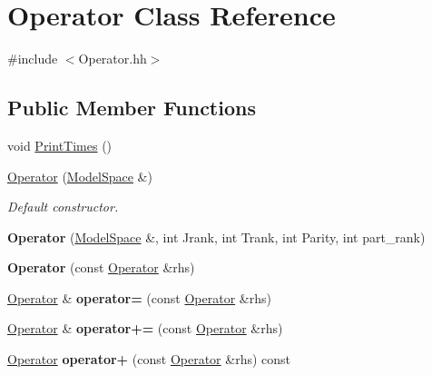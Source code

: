 \hypertarget{classOperator}{\section{Operator Class Reference}
\label{classOperator}
}


{\ttfamily \#include $<$Operator.\-hh$>$}

\subsection*{Public Member Functions}
\begin{DoxyCompactItemize}
\item 
void \hyperlink{classOperator_aa8280e8e2c6be73a9594789127b939c1}{Print\-Times} ()
\item 
\hypertarget{classOperator_ae59dd1e9ea828f88637f001e987195b6}{\hyperlink{classOperator_ae59dd1e9ea828f88637f001e987195b6}{Operator} (\hyperlink{classModelSpace}{Model\-Space} \&)}\label{classOperator_ae59dd1e9ea828f88637f001e987195b6}

\begin{DoxyCompactList}\small\item\em Default constructor. \end{DoxyCompactList}\item 
\hypertarget{classOperator_ab120301ff79330ae6593fd13445f24f1}{{\bfseries Operator} (\hyperlink{classModelSpace}{Model\-Space} \&, int Jrank, int Trank, int Parity, int part\-\_\-rank)}\label{classOperator_ab120301ff79330ae6593fd13445f24f1}

\item 
\hypertarget{classOperator_ae229a22ab49ca258f69c1c2c267b2aeb}{{\bfseries Operator} (const \hyperlink{classOperator}{Operator} \&rhs)}\label{classOperator_ae229a22ab49ca258f69c1c2c267b2aeb}

\item 
\hypertarget{classOperator_afad114ba9dee8b9c08af0b5d27c3ba86}{\hyperlink{classOperator}{Operator} \& {\bfseries operator=} (const \hyperlink{classOperator}{Operator} \&rhs)}\label{classOperator_afad114ba9dee8b9c08af0b5d27c3ba86}

\item 
\hypertarget{classOperator_a0b20b0fedb0f49c4a2e69507cdcb540b}{\hyperlink{classOperator}{Operator} \& {\bfseries operator+=} (const \hyperlink{classOperator}{Operator} \&rhs)}\label{classOperator_a0b20b0fedb0f49c4a2e69507cdcb540b}

\item 
\hypertarget{classOperator_a67d89d71379a609aa018178afe1adb8d}{\hyperlink{classOperator}{Operator} {\bfseries operator+} (const \hyperlink{classOperator}{Operator} \&rhs) const }\label{classOperator_a67d89d71379a609aa018178afe1adb8d}


\end{DoxyCompactItemize}

